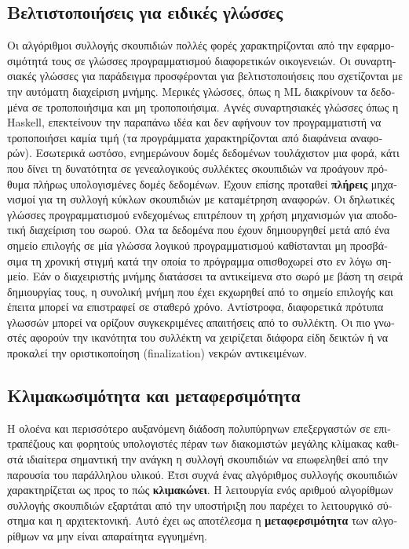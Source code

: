 \begin{greek}
\subsection{Βελτιστοποιήσεις για ειδικές γλώσσες}
Οι αλγόριθμοι συλλογής σκουπιδιών πολλές φορές χαρακτηρίζονται
από την εφαρμοσιμότητά τους σε γλώσσες προγραμματισμού διαφορετικών
οικογενειών. Οι συναρτησιακές γλώσσες για παράδειγμα προσφέρονται
για βελτιστοποιήσεις που σχετίζονται με την αυτόματη διαχείριση
μνήμης. Μερικές γλώσσες, όπως η ML διακρίνουν τα δεδομένα σε
τροποποιήσιμα και μη τροποποιήσιμα. Αγνές συναρτησιακές γλώσσες
όπως η Haskell, επεκτείνουν την παραπάνω ιδέα και δεν αφήνουν
τον προγραμματιστή να τροποποιήσει καμία τιμή (τα προγράμματα
χαρακτηρίζονται από διαφάνεια αναφορών). Εσωτερικά ωστόσο, ενημερώνουν
δομές δεδομένων τουλάχιστον μια φορά, κάτι που δίνει τη δυνατότητα
σε γενεαλογικούς συλλέκτες σκουπιδιών να προάγουν πρόθυμα πλήρως
υπολογισμένες δομές δεδομένων. Έχουν επίσης προταθεί \textbf{πλήρεις}
μηχανισμοί για τη συλλογή κύκλων σκουπιδιών με καταμέτρηση αναφορών.
Οι δηλωτικές γλώσσες προγραμματισμού ενδεχομένως επιτρέπουν τη
χρήση μηχανισμών για αποδοτική διαχείριση του σωρού. Όλα τα δεδομένα
που έχουν δημιουργηθεί μετά από ένα σημείο επιλογής σε μία γλώσσα
λογικού προγραμματισμού καθίστανται μη προσβάσιμα τη χρονική
στιγμή κατά την οποία το πρόγραμμα οπισθοχωρεί στο εν λόγω σημείο.
Εάν ο διαχειριστής μνήμης διατάσσει τα αντικείμενα στο σωρό με
βάση τη σειρά δημιουργίας τους, η συνολική μνήμη που έχει εκχωρηθεί
από το σημείο επιλογής και έπειτα μπορεί να επιστραφεί σε σταθερό
χρόνο. Αντίστροφα, διαφορετικά πρότυπα γλωσσών μπορεί να ορίζουν
συγκεκριμένες απαιτήσεις από το συλλέκτη. Οι πιο γνωστές αφορούν
την ικανότητα του συλλέκτη να χειρίζεται διάφορα είδη δεικτών
ή να προκαλεί την οριστικοποίηση (finalization) νεκρών αντικειμένων. 

\subsection{Κλιμακωσιμότητα και μεταφερσιμότητα}
Η ολοένα και περισσότερο αυξανόμενη διάδοση πολυπύρηνων επεξεργαστών
σε επιτραπέζιους και φορητούς υπολογιστές πέραν των διακομιστών
μεγάλης κλίμακας καθιστά ιδιαίτερα σημαντική την ανάγκη η συλλογή
σκουπιδιών να επωφεληθεί από την παρουσία του παράλληλου υλικού.
Έτσι συχνά ένας αλγόριθμος συλλογής σκουπιδιών χαρακτηρίζεται
ως προς το πώς \textbf{κλιμακώνει}. Η λειτουργία ενός αριθμού
αλγορίθμων συλλογής σκουπιδιών εξαρτάται από την υποστήριξη που
παρέχει το λειτουργικό σύστημα και η αρχιτεκτονική. Αυτό έχει
ως αποτέλεσμα η \textbf{μεταφερσιμότητα} των αλγορίθμων να μην
είναι απαραίτητα εγγυημένη.


\end{greek}
